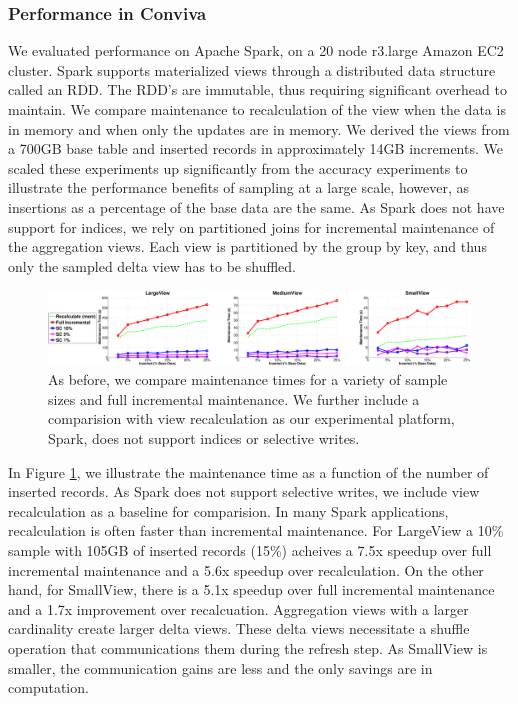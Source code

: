 \subsubsection{Performance in Conviva}
We evaluated performance on Apache Spark, on a 20 node r3.large Amazon EC2 cluster. 
Spark supports materialized views through a distributed data structure called an RDD.
The RDD's are immutable, thus requiring significant overhead to maintain.
We compare maintenance to recalculation of the view when the data is in memory and when only the updates are in memory. 
We derived the views from a 700GB base table and inserted records in approximately 14GB increments. 
We scaled these experiments up significantly from the accuracy experiments to illustrate the performance benefits of sampling at a large scale, however, as insertions as a percentage of the base data are the same.
As Spark does not have support for indices, we rely on partitioned joins for incremental maintenance of the aggregation views.
Each view is partitioned by the group by key, and thus only the sampled delta view has to be shuffled. 

\begin{figure}[ht!]

\hspace{-1em}
\includegraphics[scale=0.22]{exp/exp5-efficiency-conviva.eps}
 \caption{As before, we compare maintenance times for a variety of sample sizes and full incremental maintenance. We further include a comparision with view recalculation as our experimental platform, Spark, does not support indices or selective writes.\label{exp6conviva}}
\end{figure}

In Figure \ref{exp6conviva}, we illustrate the maintenance time as a function of the number of inserted records.
As Spark does not support selective writes, we include view recalculation as a baseline for comparision.
In many Spark applications, recalculation is often faster than incremental maintenance.
For LargeView a 10\% sample with 105GB of inserted records (15\%) acheives a  7.5x speedup over full incremental maintenance and a 5.6x speedup over recalculation.
On the other hand, for SmallView, there is a 5.1x speedup over full incremental maintenance and a 1.7x improvement over recalcuation.
Aggregation views with a larger cardinality create larger delta views.
These delta views necessitate a shuffle operation that communications them during the refresh step.
As SmallView is smaller, the communication gains are less and the only savings are in computation.



